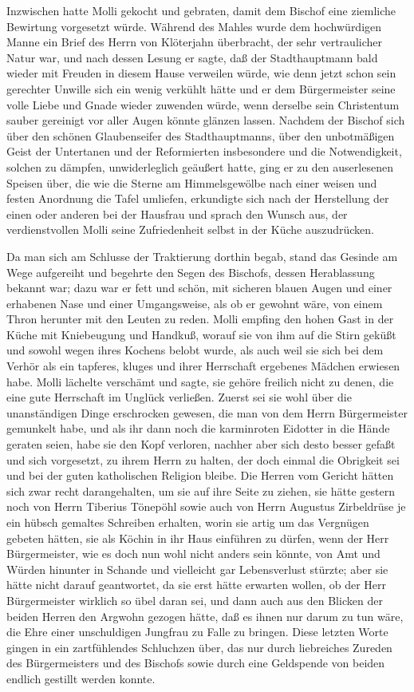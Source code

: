 Inzwischen hatte Molli gekocht und gebraten, damit dem Bischof eine
ziemliche Bewirtung vorgesetzt würde. Während des Mahles wurde dem
hochwürdigen Manne ein Brief des Herrn von Klöterjahn überbracht,
der sehr vertraulicher Natur war, und nach dessen Lesung er sagte,
daß der Stadthauptmann bald wieder mit Freuden in diesem Hause
verweilen würde, wie denn jetzt schon sein gerechter Unwille sich
ein wenig verkühlt hätte und er dem Bürgermeister seine volle Liebe
und Gnade wieder zuwenden würde, wenn derselbe sein Christentum
sauber gereinigt vor aller Augen könnte glänzen lassen. Nachdem der
Bischof sich über den schönen Glaubenseifer des Stadthauptmanns,
über den unbotmäßigen Geist der Untertanen und der Reformierten
insbesondere und die Notwendigkeit, solchen zu dämpfen,
unwiderleglich geäußert hatte, ging er zu den auserlesenen Speisen
über, die wie die Sterne am Himmelsgewölbe nach einer weisen und
festen Anordnung die Tafel umliefen, erkundigte sich nach der
Herstellung der einen oder anderen bei der Hausfrau\pagenum{[42]}
und sprach den Wunsch aus, der verdienstvollen Molli seine
Zufriedenheit selbst in der Küche auszudrücken.

Da man sich am Schlusse der Traktierung dorthin begab, stand das
Gesinde am Wege aufgereiht und begehrte den Segen des Bischofs,
dessen Herablassung bekannt war; dazu war er fett und schön, mit
sicheren blauen Augen und einer erhabenen Nase und einer
Umgangsweise, als ob er gewohnt wäre, von einem Thron herunter mit
den Leuten zu reden. Molli empfing den hohen Gast in der Küche mit
Kniebeugung und Handkuß, worauf sie von ihm auf die Stirn geküßt
und sowohl wegen ihres Kochens belobt wurde, als auch weil sie sich
bei dem Verhör als ein tapferes, kluges und ihrer Herrschaft
ergebenes Mädchen erwiesen habe. Molli lächelte verschämt und
sagte, sie gehöre freilich nicht zu denen, die eine gute Herrschaft
im Unglück verließen. Zuerst sei sie wohl über die unanständigen
Dinge erschrocken gewesen, die man von dem Herrn Bürgermeister
gemunkelt habe, und als ihr dann noch die karminroten Eidotter in
die Hände geraten seien, habe sie den Kopf verloren, nachher aber
sich desto besser gefaßt und sich vorgesetzt, zu ihrem Herrn zu
halten, der doch einmal die Obrigkeit sei und bei der guten
katholischen Religion bleibe. Die Herren vom Gericht hätten sich
zwar recht darangehalten, um sie auf ihre Seite zu ziehen, sie
hätte gestern noch von Herrn Tiberius Tönepöhl sowie auch von Herrn
Augustus Zirbeldrüse je ein hübsch gemaltes Schreiben erhalten,
worin sie artig um das Vergnügen gebeten hätten, sie als Köchin in
ihr Haus einführen zu dürfen, wenn der Herr Bürgermeister, wie es
doch nun wohl nicht anders sein könnte, von Amt und Würden hinunter
in Schande und vielleicht gar Lebensverlust stürzte; aber sie hätte
nicht darauf geantwortet, da sie erst hätte erwarten\pagenum{[43]}
wollen, ob der Herr Bürgermeister wirklich so übel daran sei, und
dann auch aus den Blicken der beiden Herren den Argwohn gezogen
hätte, daß es ihnen nur darum zu tun wäre, die Ehre einer
unschuldigen Jungfrau zu Falle zu bringen. Diese letzten Worte
gingen in ein zartfühlendes Schluchzen über, das nur durch
liebreiches Zureden des Bürgermeisters und des Bischofs sowie durch
eine Geldspende von beiden endlich gestillt werden konnte.

